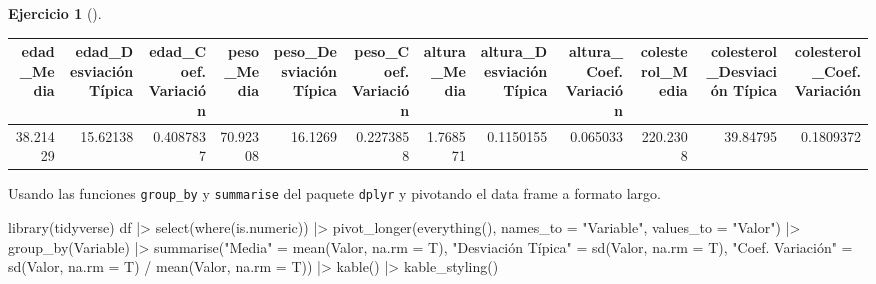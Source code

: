 \documentclass[
  a4paper,
]{scrreport}
\newenvironment{Shaded}{\begin{snugshade}}{\end{snugshade}}
\newcommand{\AttributeTok}[1]{\textcolor[rgb]{0.40,0.45,0.13}{#1}}
\newcommand{\FunctionTok}[1]{\textcolor[rgb]{0.28,0.35,0.67}{#1}}
\newcommand{\NormalTok}[1]{\textcolor[rgb]{0.00,0.23,0.31}{#1}}
\newcommand{\OtherTok}[1]{\textcolor[rgb]{0.00,0.23,0.31}{#1}}
\newcommand{\SpecialCharTok}[1]{\textcolor[rgb]{0.37,0.37,0.37}{#1}}
\newcommand{\StringTok}[1]{\textcolor[rgb]{0.13,0.47,0.30}{#1}}
\theoremstyle{definition}
\newtheorem{exercise}{Ejercicio}[chapter]
\theoremstyle{remark}
\begin{document}
\begin{exercise}[]
\begin{enumerate}
\begin{tcolorbox}
  \begin{table}
  \centering
  \begin{tabular}{r|r|r|r|r|r|r|r|r|r|r|r}
  \hline
  edad\_Media & edad\_Desviación Típica & edad\_Coef. Variación & peso\_Media & peso\_Desviación Típica & peso\_Coef. Variación & altura\_Media & altura\_Desviación Típica & altura\_Coef. Variación & colesterol\_Media & colesterol\_Desviación Típica & colesterol\_Coef. Variación\\
  \hline
  38.21429 & 15.62138 & 0.4087837 & 70.92308 & 16.1269 & 0.2273858 & 1.768571 & 0.1150155 & 0.065033 & 220.2308 & 39.84795 & 0.1809372\\
  \hline
  \end{tabular}
  \end{table}

  \end{tcolorbox}

  \begin{tcolorbox}[enhanced jigsaw, toprule=.15mm, rightrule=.15mm, arc=.35mm, colback=white, colbacktitle=quarto-callout-tip-color!10!white, toptitle=1mm, left=2mm, colframe=quarto-callout-tip-color-frame, opacityback=0, breakable, opacitybacktitle=0.6, bottomtitle=1mm, titlerule=0mm, title=\textcolor{quarto-callout-tip-color}{\faLightbulb}\hspace{0.5em}{Solución 3}, bottomrule=.15mm, coltitle=black, leftrule=.75mm]

  Usando las funciones \texttt{group\_by} y \texttt{summarise} del
  paquete \texttt{dplyr} y pivotando el data frame a formato largo.

\begin{Shaded}
\begin{Highlighting}[]
\FunctionTok{library}\NormalTok{(tidyverse)}
\NormalTok{df }\SpecialCharTok{|\textgreater{}} \FunctionTok{select}\NormalTok{(}\FunctionTok{where}\NormalTok{(is.numeric)) }\SpecialCharTok{|\textgreater{}} 
    \FunctionTok{pivot\_longer}\NormalTok{(}\FunctionTok{everything}\NormalTok{(), }\AttributeTok{names\_to =} \StringTok{"Variable"}\NormalTok{, }\AttributeTok{values\_to =} \StringTok{"Valor"}\NormalTok{) }\SpecialCharTok{|\textgreater{}}
    \FunctionTok{group\_by}\NormalTok{(Variable) }\SpecialCharTok{|\textgreater{}}
    \FunctionTok{summarise}\NormalTok{(}\StringTok{"Media"} \OtherTok{=} \FunctionTok{mean}\NormalTok{(Valor, }\AttributeTok{na.rm =}\NormalTok{ T), }
    \StringTok{"Desviación Típica"} \OtherTok{=} \FunctionTok{sd}\NormalTok{(Valor, }\AttributeTok{na.rm =}\NormalTok{ T),}
    \StringTok{"Coef. Variación"} \OtherTok{=} \FunctionTok{sd}\NormalTok{(Valor, }\AttributeTok{na.rm =}\NormalTok{ T) }\SpecialCharTok{/} \FunctionTok{mean}\NormalTok{(Valor, }\AttributeTok{na.rm =}\NormalTok{ T)) }\SpecialCharTok{|\textgreater{}}
    \FunctionTok{kable}\NormalTok{() }\SpecialCharTok{|\textgreater{}}
    \FunctionTok{kable\_styling}\NormalTok{()}
\end{Highlighting}
\end{Shaded}


\end{tcolorbox}
\end{enumerate}
\end{exercise}
\end{document}

